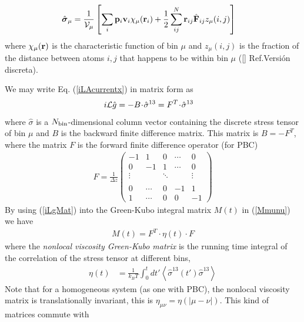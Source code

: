 \documentclass[a4paper,openright,12pt]{book}
\newcommand{\esc}{\!\cdot\!}
\newcommand{\Pendiente}[1]{{\color{green}#1}} %
\newcommand{\llangle}{\left\langle}
\newcommand{\rrangle}{\right\rangle}
\begin{document}
\begin{align}
 \hat{ \boldsymbol{\sigma}}_{\mu}
&=
\frac{1}{{\cal V}_\mu} \left[\sum_i{\bf p}_i{\bf v}_i\chi_\mu({\bf r}_i)
+\frac{1}{2}\sum^{N}_{ij}{\bf r}_{ij}\hat{\bf F}_{ij}z_\mu(i,j)\right]
\label{sbin}
\end{align}
where $\chi_\mu({\bf r})$ is the  characteristic function of bin $\mu$
and $z_{\mu}(i,j)$ is the fraction of the distance between atoms $i,j$
that happens to be within bin $\mu$ (\Pendiente{\ref{} Ref.Versión discreta}).

We may write Eq. (\ref{iLAcurrentx}) in matrix form as
\begin{align}
  i{\cal L}\hat{g}&= -B\esc\hat{\sigma}^{13} =F^T\esc\hat{\sigma}^{13}
\label{iLgMat}
\end{align}
where  $\hat{\sigma}$ is  a  $N_{\rm  bin}$-dimensional column  vector
containing the  discrete stress tensor  of bin  $\mu$ and $B$  is the
backward finite difference matrix.  This matrix is $B=-F^T$, where the
matrix $ F$ is the forward finite difference operator (for PBC)
\begin{align}
 {F}=\frac{1}{\Delta z}\left(
    \begin{array}{rrrrr}
-1&1&0&\cdots&0\\
0&-1&1&\cdots&0\\
\vdots      &&\ddots&&\vdots\\
\\
0&\cdots&0&-1&1 
\\
1&\cdots&0&0&-1 \end{array}
\right)
\label{Dforward}
\end{align}
By using (\ref{iLgMat}) into the Green-Kubo integral matrix $M(t)$ in (\ref{Mmunu})
we have
\begin{align}
  M(t)=F^T\esc\eta(t)\esc F
\label{Mtfef}
\end{align}
where  the  \textit{nonlocal  viscosity  Green-Kubo  matrix}  is  the
running  time integral  of the  correlation  of the  stress tensor  at
different bins,
\begin{align}
  \eta(t) &=\frac{1}{k_BT}\int_0^{t}dt' 
  \llangle \hat{\sigma}^{13}(t')\hat{\sigma}^{13}\rrangle
\label{non-loc}
\end{align}
Note that  for a homogeneous system  (as one with PBC),  the nonlocal
viscosity    matrix   is    translationally    invariant,   this    is
$\eta_{\mu\nu}=\eta(|\mu-\nu|)$.  This kind  of matrices  commute with
\end{document}
